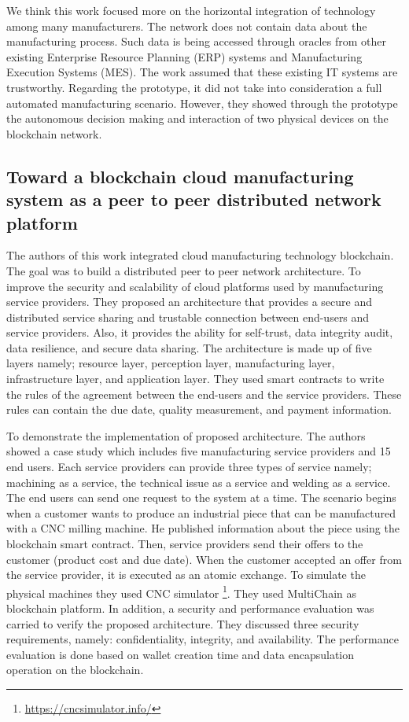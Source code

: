 \documentclass[runningheads]{llncs}
\begin{document}
\noindent
We think this work focused more on the horizontal integration of technology among many manufacturers.  The network does not contain data about the manufacturing process. Such data is being accessed through oracles from other existing Enterprise Resource Planning (ERP) systems and Manufacturing Execution Systems (MES). The work assumed that these existing IT systems are trustworthy. Regarding the prototype, it did not take into consideration a full automated manufacturing scenario. However, they showed through the prototype the autonomous decision making and interaction of two physical devices on the blockchain network.  

\subsection{Toward a blockchain cloud manufacturing system as a peer to peer distributed network platform\cite{Li2018}}


The authors of this work integrated cloud manufacturing technology blockchain. The goal was to build a distributed peer to peer network architecture. To improve the security and scalability of cloud platforms used by manufacturing service providers. They proposed an architecture that provides a secure and distributed service sharing and trustable connection between end-users and service providers. Also, it provides the ability for self-trust, data integrity audit, data resilience, and secure data sharing. The architecture is made up of five layers namely; resource layer, perception layer, manufacturing layer, infrastructure layer, and application layer. They used smart contracts to write the rules of the agreement between the end-users and the service providers. These rules can contain the due date, quality measurement, and payment information.
\bigbreak

\noindent
To demonstrate the implementation of proposed architecture. The authors showed a case study which includes five manufacturing service providers and 15 end users. Each service providers can provide three types of service namely; machining as a service, the technical issue as a service and welding as a service. The end users can send one request to the system at a time. The scenario begins when a customer wants to produce an industrial piece that can be manufactured with a CNC milling machine. He published information about the piece using the blockchain smart contract. Then, service providers send their offers to the customer (product cost and due date). When the customer accepted an offer from the service provider, it is executed as an atomic exchange. To simulate the physical machines they used CNC simulator \footnote{\url{https://cncsimulator.info/}}. They used MultiChain as blockchain platform. In addition, a security and performance evaluation was carried to verify the proposed architecture. They discussed three security requirements, namely: confidentiality, integrity, and availability. The performance evaluation is done based on wallet creation time and data encapsulation operation on the blockchain. \bigbreak
\end{document}
